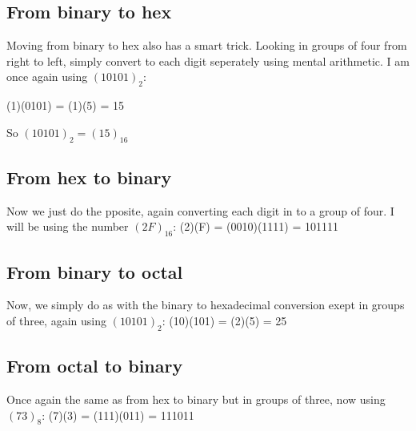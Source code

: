 \documentclass{article}
\begin{document}
\subsection{From binary to hex}
Moving from binary to hex also has a smart trick. Looking in groups of four from right to left, simply convert to each digit seperately using mental arithmetic.
I am once again using $(10101)_2$:

(1)(0101) = (1)(5) = 15

So $(10101)_2 = (15)_{16}$

\subsection{From hex to binary}
Now we just do the pposite, again converting each digit in to a group of four. I will be using the number $(2F)_{16}$:
(2)(F) = (0010)(1111) = 101111

\subsection{From binary to octal}
Now, we simply do as with the binary to hexadecimal conversion exept in groups of three, again using $(10101)_2$:
(10)(101) = (2)(5) = 25

\subsection{From octal to binary}
Once again the same as from hex to binary but in groups of three, now using $(73)_8$:
(7)(3) = (111)(011) = 111011
\end{document}
